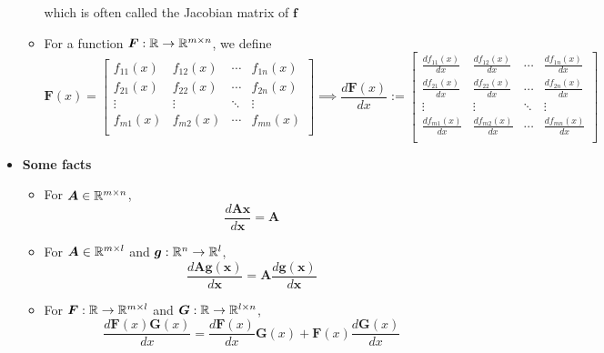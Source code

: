 \documentclass[12pt,a4paper]{article}
\begin{document}
\begin{itemize}
\begin{itemize}
\begin{equation}
    \end{equation}
    which is often called the Jacobian matrix of $\bm{f}$
  \item For a function $\bm{F}:\mathbb{R} \to \mathbb{R}^{m\times n}$, we define
    \begin{equation}\nonumber%
      \bm{F}(x) =
      \begin{bmatrix}
        f_{11}(x) & f_{12}(x) & \cdots & f_{1n}(x) \\
        f_{21}(x) & f_{22}(x) & \cdots & f_{2n}(x) \\
        \vdots & \vdots & \ddots & \vdots \\
        f_{m1}(x) & f_{m2}(x) & \cdots & f_{mn}(x) \\
      \end{bmatrix}
      \implies
      \frac{d\bm{F}(x)}{dx} :=
      \begin{bmatrix}
        \frac{df_{11}(x)}{dx} & \frac{df_{12}(x)}{dx} & \cdots & \frac{df_{1n}(x)}{dx} \\
        \frac{df_{21}(x)}{dx} & \frac{df_{22}(x)}{dx} & \cdots & \frac{df_{2n}(x)}{dx} \\
        \vdots & \vdots & \ddots & \vdots \\
        \frac{df_{m1}(x)}{dx} & \frac{df_{m2}(x)}{dx} & \cdots & \frac{df_{mn}(x)}{dx} \\
      \end{bmatrix}
    \end{equation}
  \end{itemize}

\item \textbf{Some facts}
  \begin{itemize}
  \item For $\bm{A}\in \mathbb{R}^{m\times n}$,
    \begin{equation}\nonumber%
      \frac{d\bm{A}\bm{x}}{d\bm{x}} = \bm{A}
    \end{equation}
  \item For $\bm{A}\in \mathbb{R}^{m\times l}$ and $\bm{g}:\mathbb{R}^{n}\to \mathbb{R}^{l}$,
    \begin{equation}\nonumber%
      \frac{d\bm{A}\bm{g}(\bm{x})}{d\bm{x}} = \bm{A} \frac{d\bm{g}(\bm{x})}{d\bm{x}}
    \end{equation}
  \item For $\bm{F}:\mathbb{R} \to \mathbb{R}^{m\times l}$ and  $\bm{G}:\mathbb{R} \to \mathbb{R}^{l\times n}$,
    \begin{equation}\nonumber%
      \frac{d\bm{F}(x)\bm{G}(x)}{dx} =
      \frac{d \bm{F}(x)}{dx}\bm{G}(x)
      +
      \bm{F}(x)\frac{d\bm{G}(x)}{dx}
    \end{equation}
  \end{itemize}


\end{itemize}
\end{document}
